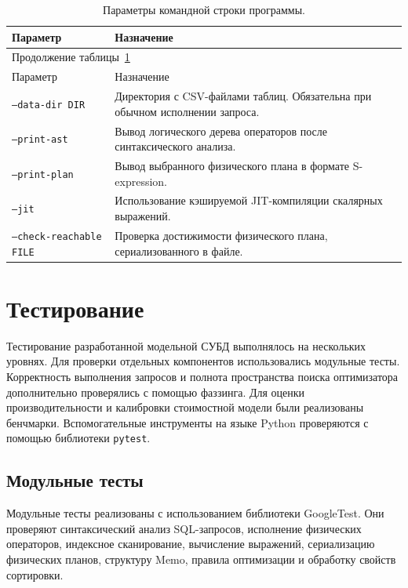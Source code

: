 \documentclass[fontsize=14pt, russian]{scrartcl}
\begin{document}
\begin{longtable}{|p{4.2cm}|p{9.3cm}|}
  \caption{Параметры командной строки программы.}\label{tbl:practice-cli}\\
  \hline
  Параметр & Назначение \\
  \hline
  \endfirsthead
  \multicolumn{2}{l}{\small Продолжение таблицы~\ref{tbl:practice-cli}}\\
  \hline
  Параметр & Назначение \\
  \hline
  \endhead
  \texttt{--data-dir DIR} &
  Директория с CSV-файлами таблиц. Обязательна при обычном исполнении запроса. \\
  \hline
  \texttt{--print-ast} &
  Вывод логического дерева операторов после синтаксического анализа. \\
  \hline
  \texttt{--print-plan} &
  Вывод выбранного физического плана в формате S-expression. \\
  \hline
  \texttt{--jit} &
  Использование кэшируемой JIT-компиляции скалярных выражений. \\
  \hline
  \texttt{--check-reachable FILE} &
  Проверка достижимости физического плана, сериализованного в файле. \\
  \hline
\end{longtable}

\section{Тестирование}

Тестирование разработанной модельной СУБД выполнялось на нескольких уровнях. Для
проверки отдельных компонентов использовались модульные тесты. Корректность
выполнения запросов и полнота пространства поиска оптимизатора дополнительно
проверялись с помощью фаззинга. Для оценки производительности и калибровки
стоимостной модели были реализованы бенчмарки. Вспомогательные инструменты на
языке Python проверяются с помощью библиотеки \verb|pytest|.

\subsection{Модульные тесты}

Модульные тесты реализованы с использованием библиотеки GoogleTest. Они
проверяют синтаксический анализ SQL-запросов, исполнение физических операторов,
индексное сканирование, вычисление выражений, сериализацию физических планов,
структуру Memo, правила оптимизации и обработку свойств сортировки.
\end{document}
